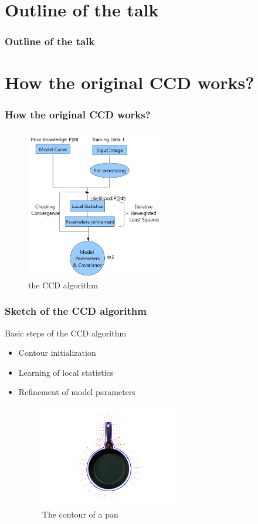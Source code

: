 \documentclass[english,10pt,presentation]{beamer}
\begin{document}
\section{Outline of the talk}
\label{sec-2}
\begin{frame}
\frametitle{Outline of the talk}
\label{sec-2_1}
\end{frame}
\section{How the original CCD works?}
\label{sec-3}
\begin{frame}
\frametitle{How the original CCD works?}
\label{sec-3_1}

   \begin{figure}[htb]
   \centering
   \includegraphics[width=6cm,angle=0]{./flowchart.jpg}
   \caption{\label{fig: flowchart}the CCD algorithm}
   \end{figure}
\end{frame}
\begin{frame}
\frametitle{Sketch of the CCD algorithm}
\label{sec-3_2}
\begin{exampleblock}{Basic steps of the CCD algorithm}
\label{sec-3_2_1}
\begin{itemize}

\item Contour initialization\\
\label{sec-3_2_1_1}%
\item Learning of local statistics\\
\label{sec-3_2_1_2}%
\item Refinement of model parameters\\
\label{sec-3_2_1_3}%
\begin{figure}[htb]
     \centering
     \includegraphics[width=6cm,angle=0]{./pan_contour.jpg}
     \caption{\label{fig:contour}The contour of a pan}
     \end{figure}
\end{itemize} %
\end{exampleblock}
\end{frame}
\end{document}
